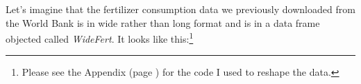 Let's imagine that the fertilizer consumption data we previously downloaded from the World Bank is in wide rather than long format and is in a data frame objected called \emph{WideFert}. It looks like this:\footnote{Please see the Appendix (page \pageref{WideAppendix}) for the code I used to reshape the data.}















































